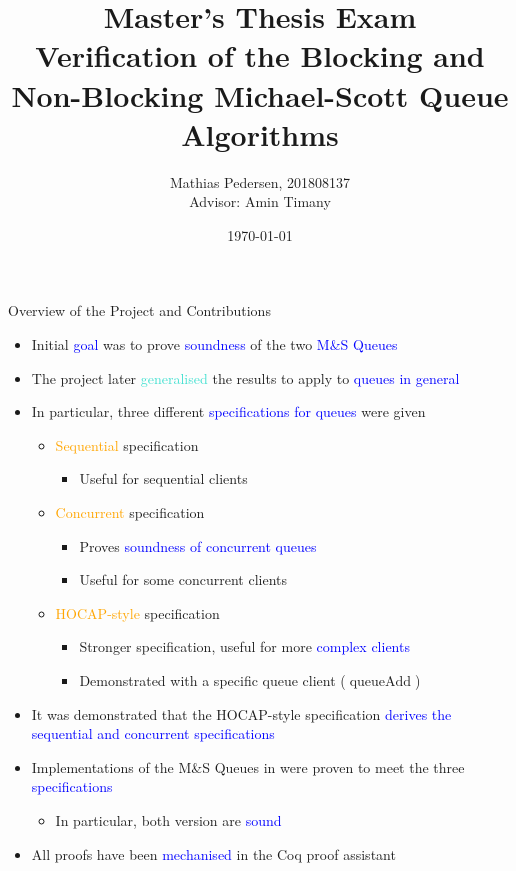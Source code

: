 \documentclass[9pt,xcolor={dvipsnames}]{beamer}
\title{Master's Thesis Exam\\
Verification of the Blocking and Non-Blocking Michael-Scott Queue Algorithms}
\author{
  Mathias Pedersen, 201808137 \texorpdfstring{\\}{with}
  {\small Advisor: Amin Timany}
}
\institute{Aarhus University}
\date{\today}
\newcommand{\queueAdd}{\operatorname{queueAdd}}
\newcommand{\msq}{M\&S Queue}
\begin{document}
\frame{\titlepage}


\begin{frame}{Overview of the Project and Contributions}
  \begin{itemize}
    \item Initial \textcolor{blue}{goal} was to prove \textcolor{blue}{soundness} of the two \textcolor{blue}{\msq{}s}
    \item The project later \textcolor{Turquoise}{generalised} the results to apply to \textcolor{blue}{queues in general}
    \pause
    \item In particular, three different \textcolor{blue}{specifications for queues} were given
    \begin{itemize}
      \item \textcolor{orange}{Sequential} specification
        \begin{itemize}
          \item Useful for sequential clients
        \end{itemize}
      \item \textcolor{orange}{Concurrent} specification
        \begin{itemize}
          \item Proves \textcolor{blue}{soundness of concurrent queues}
          \item Useful for some concurrent clients
        \end{itemize}
      \item \textcolor{orange}{HOCAP-style} specification
        \begin{itemize}
          \item Stronger specification, useful for more \textcolor{blue}{complex clients}
          \item Demonstrated with a specific queue client ($\queueAdd$)
        \end{itemize}
    \end{itemize}
    \pause
    \item It was demonstrated that the HOCAP-style specification \textcolor{blue}{derives the sequential and concurrent specifications}
    \pause
    \item \textcolor{ExampleColour}{Implementations} of the \msq{}s in \textcolor{blue}{\heaplang{}} were proven to meet the three \textcolor{blue}{specifications}
      \begin{itemize}
        \item In particular, both version are \textcolor{blue}{sound}
      \end{itemize}
    \pause
    \item All proofs have been \textcolor{blue}{mechanised} in the \textcolor[RGB]{199,154,115}{Coq} \textcolor[RGB]{222,196,152}{proof assistant}
  \end{itemize}
\end{frame}
\end{document}
